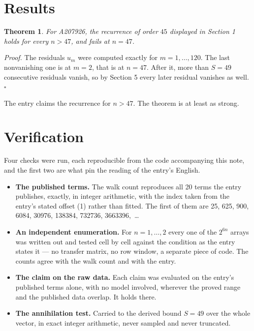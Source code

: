 \documentclass[11pt]{article}
\newtheorem{theorem}{Theorem}
\theoremstyle{definition}
\begin{document}
\section{Results}

\begin{theorem} For A207926, the recurrence of order $45$ displayed in Section 1 holds for every $n > 47$, and fails at $n = 47$.\end{theorem}

{\itshape Proof.} The residuals $u_m$ were computed exactly for $m = 1,\dots,120$. The last nonvanishing one is at $m = 2$, that is at $n = 47$. After it, more than $S = 49$ consecutive residuals vanish, so by Section 5 every later residual vanishes as well. $\square$

The entry claims the recurrence for $n > 47$. The theorem is at least as strong.

\section{Verification}

Four checks were run, each reproducible from the code accompanying this note, and the first two are what pin the reading of the entry's English.

\begin{itemize}

\item {\bfseries The published terms.} The walk count reproduces all 20 terms the entry publishes, exactly, in integer arithmetic, with the index taken from the entry's stated offset (1) rather than fitted. The first of them are 25, 625, 900, 6084, 30976, 138384, 732736, 3663396,~\dots

\item {\bfseries An independent enumeration.} For $n = 1,\dots,2$ every one of the $2^{6n}$ arrays was written out and tested cell by cell against the condition as the entry states it --- no transfer matrix, no row window, a separate piece of code. The counts agree with the walk count and with the entry.

\item {\bfseries The claim on the raw data.} Each claim was evaluated on the entry's published terms alone, with no model involved, wherever the proved range and the published data overlap. It holds there.

\item {\bfseries The annihilation test.} Carried to the derived bound $S = 49$ over the whole vector, in exact integer arithmetic, never sampled and never truncated.

\end{itemize}
\end{document}
